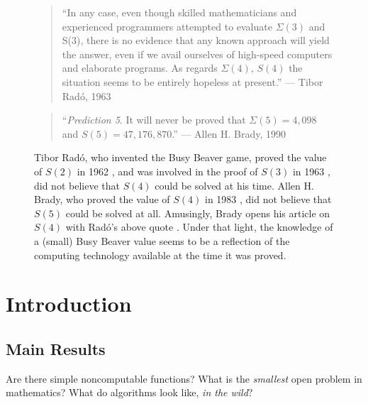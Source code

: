 \documentclass[a4paper,british]{article}
\theoremstyle{definition} %
\numberwithin{equation}{section}
\theoremstyle{definition} %
\newcommand{\BBtheFifth}{47{,}176{,}870}
\newcommand{\SigmaTheFifth}{4{,}098}
\newcommand{\radofull}{Tibor Rad\'o\xspace}
\newcommand{\rado}{Rad\'o\xspace}
\begin{document}
\begin{figure}
    \begin{quote}
        ``In any case, even though skilled mathematicians and experienced programmers attempted to evaluate $\Sigma(3)$ and S(3), there is no evidence that any known approach will yield the answer, even if we avail ourselves of high-speed computers and elaborate programs. As regards $\Sigma(4)$, $S(4)$ the situation seems to be entirely hopeless at present.'' --- \radofull, 1963 \cite{Rado_1963}
    \end{quote}
    \begin{quote}
        ``\textit{Prediction 5}. It will never be proved that $\Sigma(5) = \SigmaTheFifth$ and $S(5) = \BBtheFifth$.'' --- Allen H. Brady, 1990 \cite{BradyMeaningOfLife}
    \end{quote}
    \caption{\radofull, who invented the Busy Beaver game, proved the value of $S(2)$ in 1962 \cite{Rado_1962}, and was involved in the proof of $S(3)$ in 1963 \cite{Lin1963}, did not believe that $S(4)$ could be solved at his time. Allen H. Brady, who proved the value of $S(4)$ in 1983 \cite{Brady83}, did not believe that $S(5)$ could be solved at all. Amusingly, Brady opens his article on $S(4)$ with \rado's above quote \cite{Brady83}. Under that light, the knowledge of a (small) Busy Beaver value seems to be a reflection of the computing technology available at the time it was proved.}
\end{figure}

\vspace{-40pt}

\section{Introduction}

\subsection{Main Results}\label{sec:intro:mainresults}

\newcommand{\noncomput}{noncomputable\xspace}
\newcommand{\BBfull}{Busy Beaver\xspace}
\newcommand{\Coq}{Coq\xspace}
\newcommand{\CoqProofReleaseURL}{\url{https://github.com/ccz181078/Coq-BB5}}

\newcommand{\ie}{i.e.~}
\newcommand{\eg}{e.g.~}

Are there simple \noncomput functions? What is the \textit{smallest} open problem in mathematics? What do algorithms look like, \textit{in the wild}?
\end{document}
